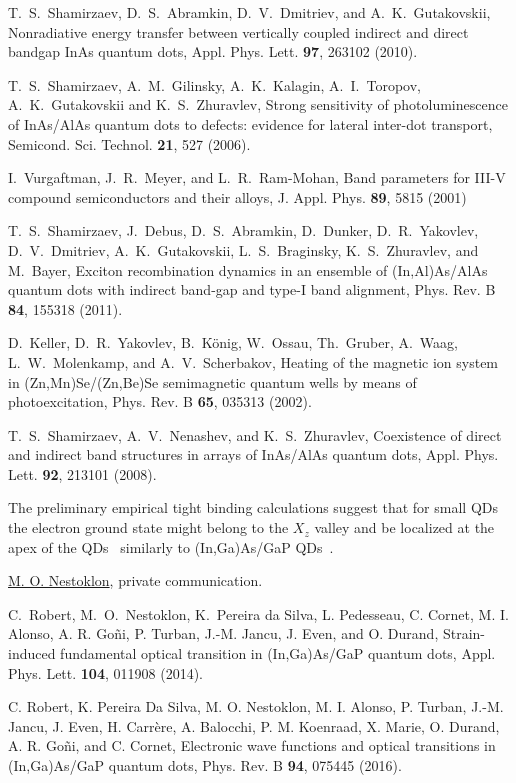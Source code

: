 \documentclass[twocolumn,showpacs,preprintnumbers,amsmath,amssymb,aps]{revtex4-1}
\begin{document}
\begin{thebibliography}{}
 T.~S.~Shamirzaev, D.~S.~Abramkin,
D.~V.~Dmitriev, and A.~K.~Gutakovskii, Nonradiative energy transfer
between vertically coupled indirect and direct bandgap InAs quantum
dots, Appl. Phys. Lett. \textbf{97}, 263102 (2010).

 T.~S.~Shamirzaev, A.~M.~Gilinsky, A.~K.~Kalagin, A.~I.~Toropov,
A.~K.~Gutakovskii and K.~S.~Zhuravlev, Strong sensitivity of
photoluminescence of InAs/AlAs quantum dots to defects: evidence for
lateral inter-dot transport, Semicond. Sci. Technol. \textbf{21},
527 (2006).


 I.~Vurgaftman, J.~R.~Meyer, and L.~R.~Ram-Mohan, Band parameters for III-V compound semiconductors and their alloys, J. Appl. Phys. {\bf 89}, 5815 (2001)

 T.~S.~Shamirzaev, J.~Debus, D.~S.~Abramkin, D.~Dunker, D.~R.~Yakovlev, D.~V.~Dmitriev, A.~K.~Gutakovskii, L.~S.~Braginsky,
K.~S.~Zhuravlev, and M.~Bayer, Exciton recombination dynamics in an ensemble of (In,Al)As/AlAs quantum dots with indirect band-gap and type-I band alignment, Phys. Rev. B \textbf{84}, 155318
(2011).

 D.~Keller, D.~R.~Yakovlev, B.~K\"onig, W.~Ossau, Th.~Gruber, A.~Waag, L.~W.~Molenkamp, and A.~V.~Scherbakov,
Heating of the magnetic ion system in (Zn,Mn)Se/(Zn,Be)Se semimagnetic quantum wells by means of photoexcitation, Phys. Rev. B \textbf{65}, 035313
(2002).

 T.~S.~Shamirzaev,  A.~V.~Nenashev, and K.~S.~Zhuravlev,
Coexistence of direct and indirect band structures in arrays of
InAs/AlAs quantum dots, Appl. Phys. Lett. \textbf{92}, 213101
(2008).

 The preliminary empirical tight binding calculations suggest that for small QDs the electron ground state might belong to the $X_z$ valley and be localized at the apex of the QDs~\cite{Nestoklon} similarly to (In,Ga)As/GaP QDs~\cite{Cedric1,Cedric2}.

 \href{https://orcid.org/0000-0002-0454-342X}{M. O. Nestoklon}, private communication.

 C.~Robert, M.~O.~Nestoklon, K.~Pereira da Silva, L. Pedesseau, C. Cornet, M. I. Alonso, A. R. Go{\~n}i, P. Turban, J.-M. Jancu, J. Even, and O. Durand, Strain-induced fundamental optical transition in (In,Ga)As/GaP quantum dots, Appl. Phys. Lett. \textbf{104}, 011908 (2014).

 C. Robert, K. Pereira Da Silva, M. O. Nestoklon, M. I. Alonso, P. Turban, J.-M. Jancu, J. Even, H. Carr\`ere, A. Balocchi, P. M. Koenraad, X. Marie, O. Durand, A. R. Go{\~n}i, and C. Cornet, Electronic wave functions and optical transitions in (In,Ga)As/GaP quantum dots, Phys. Rev. B \textbf{94}, 075445 (2016).



\end{thebibliography}
\end{document}
